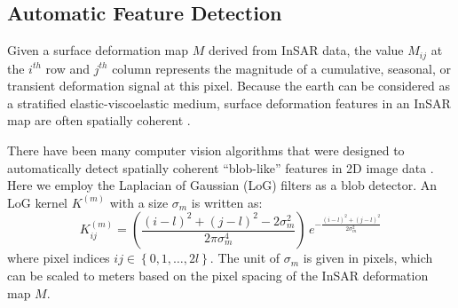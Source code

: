\documentclass{utexasthesis}
\begin{document}


\subsection{Automatic Feature Detection}
\label{subsec:methods-1-log}

Given a surface deformation map $M$ derived from InSAR data, the value $ M_{ij} $ at the $i^{th}$ row and $j^{th}$ column represents the magnitude of a cumulative, seasonal, or transient deformation signal at this pixel. Because the earth can be considered as a stratified elastic-viscoelastic medium, surface deformation features in an InSAR map are often spatially coherent \cite{Segall2010EarthquakeVolcanoDeformation}.

There have been many computer vision algorithms that were designed to automatically detect spatially coherent ``blob-like'' features in 2D image data \cite{Lindeberg1993DetectingSalientBlob, Lindeberg1998FeatureDetectionAutomatic, Lowe2004DistinctiveImageFeatures}. Here we employ the Laplacian of Gaussian (LoG) filters as a blob detector. An LoG kernel $K^{(m)}$ with a size $\sigma_m$ is written as:
\begin{equation}
K^{(m)}_{ij} = \left(\frac{(i - l)^2 + (j - l)^2 - 2\sigma_m^2}{2 \pi \sigma_m^4}\right) \, e^{-\frac{ (i - l)^2 + (j - l)^2}{2 \sigma_m^2}} \label{eq:log-kernel}
\end{equation}
where pixel indices $ij  \in \left\lbrace 0, 1, \ldots, 2l \right\rbrace$. The unit of $\sigma_m$ is given in pixels, which can be scaled to meters based on the pixel spacing of the InSAR deformation map $M$.

\end{document}
